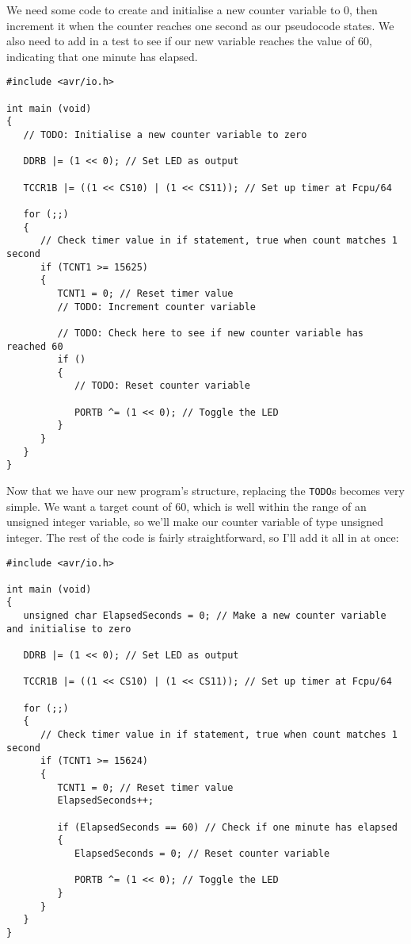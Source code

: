 \documentclass[a4paper,oneside,notitlepage]{book}
\begin{document}
We need some code to create and initialise a new counter variable to 0, then increment it when the counter reaches one second as our pseudocode states. We also need to add in a test to see if our new variable reaches the value of 60, indicating that one minute has elapsed.

\begin{center}
\begin{lstlisting}
#include <avr/io.h>

int main (void)
{
   // TODO: Initialise a new counter variable to zero

   DDRB |= (1 << 0); // Set LED as output

   TCCR1B |= ((1 << CS10) | (1 << CS11)); // Set up timer at Fcpu/64

   for (;;)
   {
      // Check timer value in if statement, true when count matches 1 second
      if (TCNT1 >= 15625)
      {
         TCNT1 = 0; // Reset timer value
         // TODO: Increment counter variable

         // TODO: Check here to see if new counter variable has reached 60
         if ()
         {
            // TODO: Reset counter variable

            PORTB ^= (1 << 0); // Toggle the LED
         }
      }
   }
}
\end{lstlisting}
\end{center}

Now that we have our new program's structure, replacing the \texttt{TODO}s becomes very simple. We want a target count of 60, which is well within the range of an unsigned integer variable, so we'll make our counter variable of type unsigned integer. The rest of the code is fairly straightforward, so I'll add it all in at once:

\begin{center}
\begin{lstlisting}
#include <avr/io.h>

int main (void)
{
   unsigned char ElapsedSeconds = 0; // Make a new counter variable and initialise to zero

   DDRB |= (1 << 0); // Set LED as output

   TCCR1B |= ((1 << CS10) | (1 << CS11)); // Set up timer at Fcpu/64

   for (;;)
   {
      // Check timer value in if statement, true when count matches 1 second
      if (TCNT1 >= 15624)
      {
         TCNT1 = 0; // Reset timer value
         ElapsedSeconds++;

         if (ElapsedSeconds == 60) // Check if one minute has elapsed
         {
            ElapsedSeconds = 0; // Reset counter variable

            PORTB ^= (1 << 0); // Toggle the LED
         }
      }
   }
}
\end{lstlisting}
\end{center}
\end{document}
